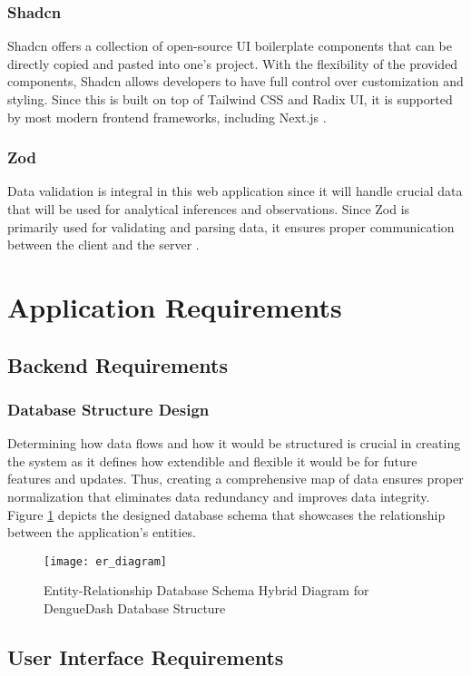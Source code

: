 \subsubsection{Shadcn}
Shadcn offers a collection of open-source UI boilerplate components that can be directly copied and pasted into one's project. With the flexibility of the provided components, Shadcn allows developers to have full control over customization and styling. Since this is built on top of Tailwind CSS and Radix UI, it is supported by most modern frontend frameworks, including Next.js \cite{shadcn-no-date}.

\subsubsection{Zod}
Data validation is integral in this web application since it will handle crucial data that will be used for analytical inferences and observations. Since Zod is primarily used for validating and parsing data, it ensures proper communication between the client and the server \cite{zod-nd}. 

\section{Application Requirements}

\subsection{Backend Requirements}
\subsubsection{Database Structure Design}
Determining how data flows and how it would be structured is crucial in creating the system as it defines how extendible and flexible it would be for future features and updates. Thus, creating a comprehensive map of data ensures proper normalization that eliminates data redundancy and improves data integrity. Figure \ref{fig:er_diagram} depicts the designed database schema that showcases the relationship between the application's entities. 
\begin{figure}[H]
	\centering
	\texttt{[image: er\_diagram]}
	\caption{Entity-Relationship Database Schema Hybrid Diagram for DengueDash Database Structure}
	\label{fig:er_diagram}
\end{figure}

\subsection{User Interface Requirements}

